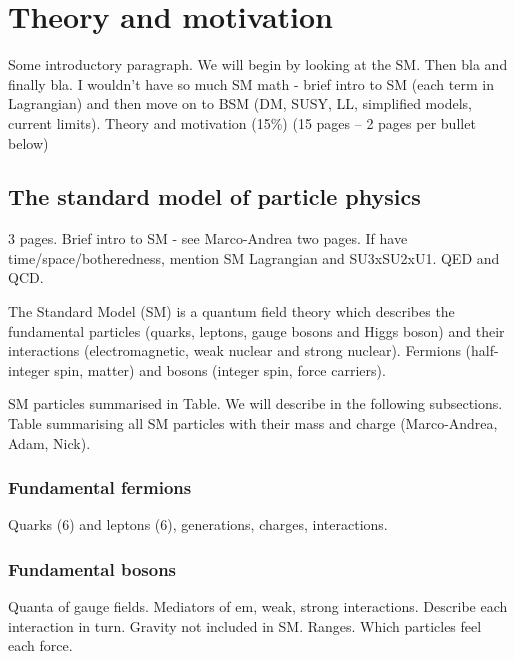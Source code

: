 \chapter{Theory and motivation}
\label{chap:theory}



Some introductory paragraph. We will begin by looking at the SM. Then bla and 
finally bla. I wouldn’t have so much SM math - brief intro to SM (each term in 
Lagrangian) and then move on to BSM (DM, SUSY, LL, simplified models, current 
limits). Theory and motivation (15\%) (15 pages – 2 pages per bullet below)

\section{The standard model of particle physics}
\label{sec:theory-sm}
3 pages. Brief intro to SM - see Marco-Andrea two pages.
If have time/space/botheredness, mention SM Lagrangian and SU3xSU2xU1. QED and 
QCD.

The Standard Model (SM) is a quantum field theory which describes the 
fundamental particles (quarks, leptons, gauge bosons and Higgs boson) and their 
interactions (electromagnetic, weak nuclear and strong nuclear).
Fermions (half-integer spin, matter) and bosons (integer spin, force carriers).

SM particles summarised in Table. We will describe in the following subsections.
Table summarising all SM particles with their mass and charge (Marco-Andrea, 
Adam, Nick).

\subsection{Fundamental fermions}
Quarks (6) and leptons (6), generations, charges, interactions.

\subsection{Fundamental bosons}
Quanta of gauge fields. Mediators of em, weak, strong interactions. Describe 
each interaction in turn. Gravity not included in SM. Ranges. Which particles 
feel each force.

